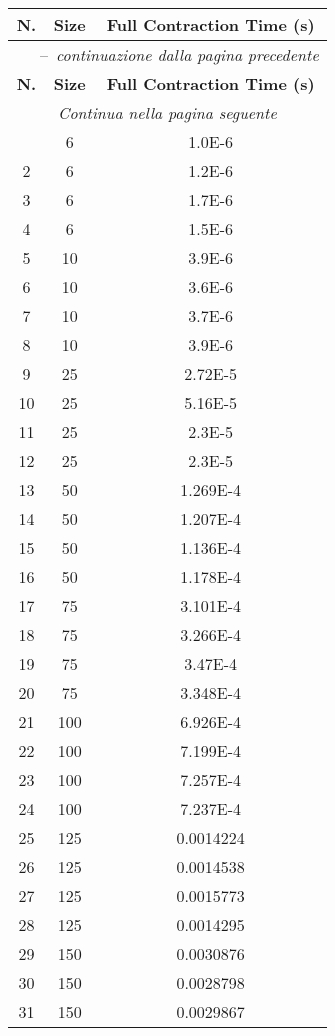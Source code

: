 \begin{center}
	\begin{longtable}{|c|c|c|}	
		\hline
		\textbf{N.} & \textbf{Size} & \textbf{Full Contraction Time (s)} \\ \hline
		\endfirsthead
		\multicolumn{3}{|c|}{\tablename\ \thetable\ \ --\  \textit{continuazione dalla pagina precedente}} \\
		\hline
		\textbf{N.} & \textbf{Size} & \textbf{Full Contraction Time (s)} \\ \hline
		\endhead
		\hline \multicolumn{3}{|c|}{\textit{Continua nella pagina seguente}} \\
		\endfoot  
		\endlastfoot
		\hline
		1 &	6 & 1.0E-6\\
		2 &	6 & 1.2E-6\\
		3 &	6 & 1.7E-6\\
		4 &	6 & 1.5E-6\\
		5 &	10 & 3.9E-6\\
		6 &	10 & 3.6E-6\\
		7 &	10 & 3.7E-6\\
		8 &	10 & 3.9E-6\\
		9 &	25 & 2.72E-5\\
		10 & 25	& 5.16E-5\\
		11 & 25	& 2.3E-5\\
		12 & 25	& 2.3E-5\\
		13 & 50	& 1.269E-4\\
		14 & 50	& 1.207E-4\\
		15 & 50	& 1.136E-4\\
		16 & 50	& 1.178E-4\\
		17 & 75	& 3.101E-4\\
		18 & 75	& 3.266E-4\\
		19 & 75	& 3.47E-4\\
		20 & 75	& 3.348E-4\\
		21 & 100 & 6.926E-4\\
		22 & 100 & 7.199E-4\\
		23 & 100 & 7.257E-4\\
		24 & 100 & 7.237E-4\\
		25 & 125 & 0.0014224\\
		26 & 125 & 0.0014538\\
		27 & 125 & 0.0015773\\
		28 & 125 & 0.0014295\\
		29 & 150 & 0.0030876\\
		30 & 150 & 0.0028798\\
		31 & 150 & 0.0029867\\

\end{longtable}
\end{center}
